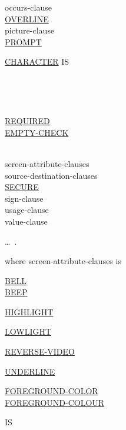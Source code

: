 \documentclass[a4paper,oneside,svgnames]{scrbook}
\makeatletter
\newcommand{\key}[1]{\underline{#1}}
\newcommand{\miscext}[1]{%
  \colorbox{blue!50}{#1}}
\newcommand{\pending}[1]{%
  \textcolor{gray!75}{#1}}
\newenvironment{0-1}{$\left[ \begin{tabular}{@{}l@{}}}{\end{tabular} \right]$}
\newenvironment{1=}{$\left\{ \begin{tabular}{@{}l@{}}}{\end{tabular} \right\}$}
\makeatother
\begin{document}
\begin{0-1}
  occurs-clause \\
  \miscext{\pending{\key{OVERLINE}}} \\
  picture-clause \\

  \key{PROMPT}
  \begin{0-1}
    \key{CHARACTER} IS
    \begin{1=}
      \identifier \\
      \literal
    \end{1=}
  \end{0-1} \\
  
  \begin{1=}
    \key{REQUIRED} \\
    \miscext{\key{EMPTY-CHECK}}
  \end{1=} \\


  screen-attribute-clauses \\
  source-destination-clauses \\
  
  \key{SECURE} \\
  sign-clause \\

  usage-clause \\
  value-clause
\end{0-1}\ldots\ {}.

where screen-attribute-clauses is

\begin{0-1}
  \key{BELL} \\
  \key{BEEP}
\end{0-1}

\begin{0-1}
  \key{HIGHLIGHT}
\end{0-1}

\begin{0-1}
  \key{LOWLIGHT}
\end{0-1}

\begin{0-1}
  \key{REVERSE-VIDEO}
\end{0-1}

\begin{0-1}
  \key{UNDERLINE}
\end{0-1}


\begin{0-1}
  \begin{1=}
    \key{FOREGROUND-COLOR} \\
    \miscext{\key{FOREGROUND-COLOUR}}
  \end{1=}
  IS
  \begin{1=}
    \identifier \\
    \integer
  \end{1=}
\end{0-1}
\end{document}
